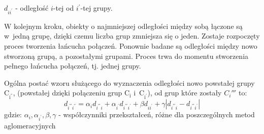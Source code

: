 \documentclass[12pt,a4paper]{report}
\begin{document}
$d_{ii^{'}}$ - odległość $i$-tej od $i^{'}$-tej grupy.

W kolejnym kroku, obiekty o najmniejszej odległości między sobą łączone są w~jedną grupę, dzięki czemu liczba grup zmniejsza się o jeden. Zostaje rozpoczęty proces tworzenia łańcucha połączeń. Ponownie badane są odległości między nowo stworzoną grupą, a pozostałymi grupami. Proces trwa do momentu stworzenia pełnego łańcucha połączeń, tj. jednej grupy. 


Ogólna postać wzoru służącego do wyznaczenia odległości nowo powstałej grupy $\mathrm{C_{i^{''}}}$, (powstałej dzięki połączeniu grup $\mathrm{C_{i}}$ i~$\mathrm{C_{i^{'}}}$), od grup które zostały ${C_i{'''}}$ to:
$$
d_{i^{'''}i^{''}}=\alpha_{i}d_{i^{'''}i} + \alpha_{i^{'}}d_{i^{'''}i^{'}} + \beta d_{ii^{'}} + \gamma|d_{i^{'''}i} - d_{i^{'''}i^{'}}| 
$$
gdzie:
$\alpha_{i},\alpha_{i^{'}}, \beta, \gamma$ - współczynniki przekształceń, różne dla poszczególnych metod aglomeracyjnych
\end{document}
